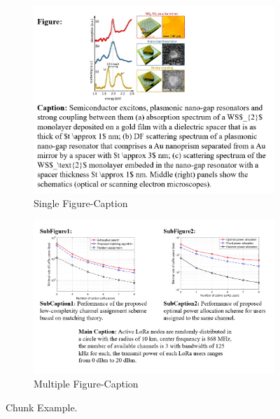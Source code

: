 \begin{figure}[!t]
    \centering
  \begin{subfigure}{0.45\textwidth}
    \centering
    \includegraphics[width=\textwidth]{figs/examples/1-1.png}
    \caption{Single Figure-Caption}
    \label{fig:subfig1}
  \end{subfigure}
  \hfill
  \begin{subfigure}{0.45\textwidth}
    \centering
    \includegraphics[width=\textwidth]{figs/examples/1-2.png}
    \caption{Multiple Figure-Caption}
    \label{fig:subfig2}
  \end{subfigure}
  \caption{Chunk Example. }
  \label{fig:chunk_example}
\end{figure}